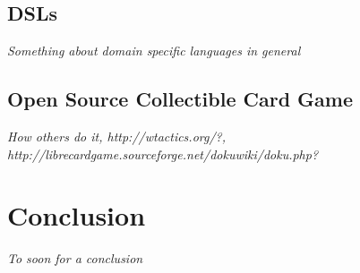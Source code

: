 \documentclass[twocolumn]{phdsymp}
\begin{document}
\subsection{DSLs}
\textit{Something about domain specific languages in general}

\subsection{Open Source Collectible Card Game}
\textit{How others do it, http://wtactics.org/?, http://librecardgame.sourceforge.net/dokuwiki/doku.php?}

\section{Conclusion}
\label{Conclusion}
\textit{To soon for a conclusion}
\end{document}
